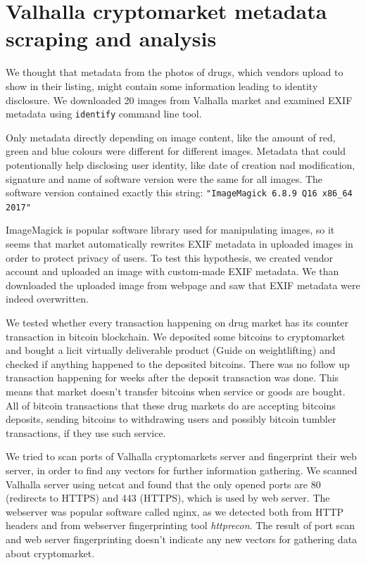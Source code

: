 \documentclass[
  digital, %
  table,   %
  lof,     %
  lot,     %
  oneside
]{fithesis3}
\begin{document}
\section{Valhalla cryptomarket metadata scraping and analysis}

We thought that metadata from the photos of drugs, which vendors upload
to show in their listing, might contain some information leading to identity disclosure.
We downloaded 20 images from Valhalla market and examined 
EXIF metadata using \texttt{identify} command line tool.

Only metadata directly depending on image content, like the amount of red, green and blue colours
were different for different images.
Metadata that could potentionally help disclosing user identity,
like date of creation nad modification, signature and name of software version were the same for all images.
The software version contained exactly this string:
\texttt{"ImageMagick 6.8.9 Q16 x86\_64 2017"}

ImageMagick is popular software library used for manipulating images, so it seems
that market automatically rewrites EXIF metadata in uploaded images in order to protect privacy of users.
To test this hypothesis, we created vendor account and uploaded an image with
custom-made EXIF metadata. We than downloaded the uploaded image from webpage and 
saw that EXIF metadata were indeed overwritten.

We tested whether every transaction happening on drug market has its counter transaction
in bitcoin blockchain.
We deposited some bitcoins to cryptomarket and bought a licit virtually deliverable
product (Guide on weightlifting) and checked if anything happened to the deposited bitcoins.
There was no follow up transaction happening for weeks after the deposit transaction was done.
This means that market doesn't transfer bitcoins when service or goods are bought.
All of bitcoin transactions that these drug markets do 
are accepting bitcoins deposits,
sending bitcoins to withdrawing users and possibly bitcoin tumbler transactions, if they
use such service.

We tried to scan ports of Valhalla cryptomarkets server and fingerprint their web server,
in order to find any vectors for further information gathering. 
We scanned Valhalla server using netcat and found that the only opened ports are 80 (redirects to HTTPS) and 443 (HTTPS),
which is used by web server. The webserver was popular software called nginx, as we detected
both from HTTP headers and from webserver fingerprinting tool \emph{httprecon}.
The result of port scan and web server fingerprinting doesn't indicate
any new vectors for gathering data about cryptomarket.
\end{document}
